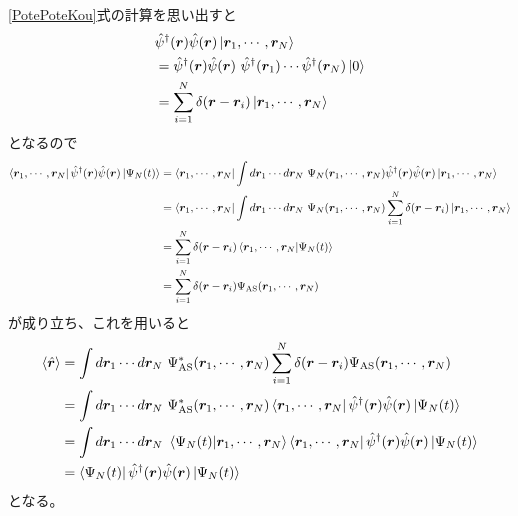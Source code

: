 \documentclass[dvipdfmx, 11pt, a4paper]{jsarticle}
\theoremstyle{definition}
\numberwithin{equation}{section}
\begin{document}
    \begin{derivationBox}
        \eqref{PotePoteKou}式の計算を思い出すと
        \begin{align}
            &\hat{\psi}^\dagger(\bm{r})\hat{\psi}(\bm{r}) \ket{\bm{r}_1,\cdots,\bm{r}_N} \notag \\
            &=
            \hat{\psi}^\dagger(\bm{r})\hat{\psi}(\bm{r})\ \hat{\psi}^\dagger(\bm{r}_1)\cdots\hat{\psi}^\dagger(\bm{r}_N)\ket{0} \notag \\
            &= \sum_{i=1}^N\delta(\bm{r}-\bm{r}_i)\ket{\bm{r}_1,\cdots,\bm{r}_N}
        \end{align}
        となるので
        \begin{align}
            \bra{\bm{r}_1,\cdots,\bm{r}_N}\hat{\psi}^\dagger(\bm{r})\hat{\psi}(\bm{r}) \ket{\Psi_N(t)} &= \bra{\bm{r}_1,\cdots,\bm{r}_N}\int d\bm{r}_1\cdots d\bm{r}_N\ \Psi_N(\bm{r}_1,\cdots,\bm{r}_N) \hat{\psi}^\dagger(\bm{r})\hat{\psi}(\bm{r})\ket{\bm{r}_1,\cdots,\bm{r}_N} \notag  \\
            &= \bra{\bm{r}_1,\cdots,\bm{r}_N}\int d\bm{r}_1\cdots d\bm{r}_N\ \Psi_N(\bm{r}_1,\cdots,\bm{r}_N) \sum_{i=1}^N\delta(\bm{r}-\bm{r}_i)\ket{\bm{r}_1,\cdots,\bm{r}_N} \notag \\
            &= \sum_{i=1}^N\delta(\bm{r}-\bm{r}_i) \braket{\bm{r}_1,\cdots,\bm{r}_N|\Psi_N(t)} \notag \\
            &= \sum_{i=1}^N\delta(\bm{r}-\bm{r}_i) \Psi_{\text{AS}}(\bm{r}_1,\cdots,\bm{r}_N)
        \end{align}
        が成り立ち、これを用いると
        \begin{align}
            \braket{\hat{\bm{r}}} &=\int d\bm{r}_1 \cdots d\bm{r}_N\ \Psi_{\text{AS}}^* (\bm{r}_1,\cdots,\bm{r}_N) \sum_{i=1}^N \delta(\bm{r}-\bm{r}_i)\Psi_{\text{AS}} (\bm{r}_1,\cdots,\bm{r}_N) \\
        &= \int d\bm{r}_1 \cdots d\bm{r}_N\ \Psi_{\text{AS}}^* (\bm{r}_1,\cdots,\bm{r}_N) \bra{\bm{r}_1,\cdots,\bm{r}_N}\hat{\psi}^\dagger(\bm{r})\hat{\psi}(\bm{r}) \ket{\Psi_N(t)} \\
        &= \int d\bm{r}_1 \cdots d\bm{r}_N\ \braket{\Psi_N(t)|\bm{r}_1,\cdots,\bm{r}_N} \bra{\bm{r}_1,\cdots,\bm{r}_N}\hat{\psi}^\dagger(\bm{r})\hat{\psi}(\bm{r}) \ket{\Psi_N(t)} \\
        &=\bra{\Psi_N(t)}\hat{\psi}^\dagger(\bm{r})\hat{\psi}(\bm{r}) \ket{\Psi_N(t)} 
        \end{align}
        となる。
    \end{derivationBox}
\end{document}
